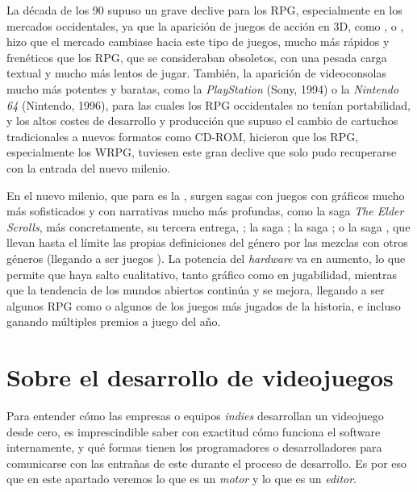 \medskip

La década de los 90 supuso un grave declive para los RPG, especialmente en los mercados occidentales, ya que la aparición de juegos de acción en 3D, como ,  o , hizo que el mercado cambiase hacia este tipo de juegos, mucho más rápidos y frenéticos que los RPG, que se consideraban obsoletos, con una pesada carga textual y mucho más lentos de jugar. También, la aparición de videoconsolas mucho más potentes y baratas, como la \textit{PlayStation} (Sony, 1994) o la \textit{Nintendo 64} (Nintendo, 1996), para las cuales los RPG occidentales no tenían portabilidad, y los altos costes de desarrollo y producción que supuso el cambio de cartuchos tradicionales a nuevos formatos como CD-ROM, hicieron que los RPG, especialmente los WRPG, tuviesen este gran declive que solo pudo recuperarse con la entrada del nuevo milenio.

\medskip

En el nuevo milenio, que para \citeauthor{barton2008dungeons} es la , surgen sagas con juegos con gráficos mucho más sofisticados y con narrativas mucho más profundas, como la saga \textit{The Elder Scrolls}, más concretamente, su tercera entrega, ; la saga ; la saga ; o la saga , que llevan hasta el límite las propias definiciones del género por las mezclas con otros géneros (llegando a ser juegos ). La potencia del \textit{hardware} va en aumento, lo que permite que haya salto cualitativo, tanto gráfico como en jugabilidad, mientras que la tendencia de los mundos abiertos continúa y se mejora, llegando a ser algunos RPG como  o  algunos de los juegos más jugados de la historia, e incluso ganando múltiples premios a juego del año.

\section{Sobre el desarrollo de videojuegos}
Para entender cómo las empresas o equipos \textit{indies} desarrollan un videojuego desde cero, es imprescindible saber con exactitud cómo funciona el software internamente, y qué formas tienen los programadores o desarrolladores para comunicarse con las entrañas de este durante el proceso de desarrollo. Es por eso que en este apartado veremos lo que es un \textit{motor} y lo que es un \textit{editor}.


